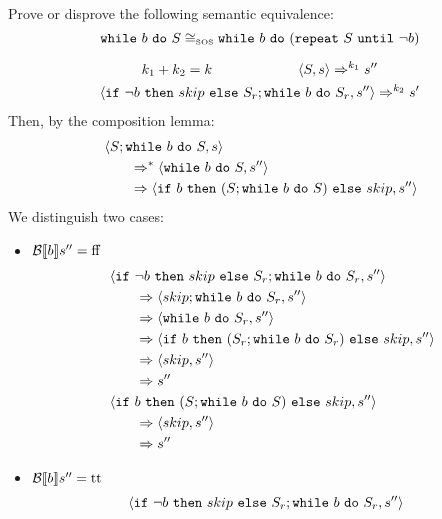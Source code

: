 \begin{exercise}{
    Prove or disprove the following semantic equivalence:
    \[ \texttt{while}\ b\ \texttt{do}\ S \cong_{\text{\tiny SOS}} \texttt{while}\ b\ \texttt{do}\ (\texttt{repeat}\ S\ \texttt{until}\ \neg b)  \]\vspace*{-0.6cm}
}
\begin{itemize}
\begin{itemize}
\begin{itemize}
\begin{gather*}
                            k_1 + k_2 = k \qquad\qquad\qquad \left<S, s\right> \Rightarrow^{k_1} s'' \\
                            \left<\texttt{if}\ \neg b\ \texttt{then}\ skip\ \texttt{else}\ S_r; \texttt{while}\ b\ \texttt{do}\ S_r, s''\right> \Rightarrow^{k_2} s'
                        \end{gather*}
                        Then, by the composition lemma:
                        \begin{align*}
                            &\left<S; \texttt{while}\ b\ \texttt{do}\ S, s\right>
                            \\&\qquad\Rightarrow^* \left<\texttt{while}\ b\ \texttt{do}\ S, s''\right>
                            \\&\qquad\Rightarrow \left<\texttt{if}\ b\ \texttt{then}\ (S; \texttt{while}\ b\ \texttt{do}\ S)\ \texttt{else}\ skip, s''\right>
                        \end{align*}
                        We distinguish two cases:
                        \begin{itemize}
                            \item $\mathcal{B} \llbracket b \rrbracket s'' = \text{ff}$
                                \begin{align*}
                                    &\left<\texttt{if}\ \neg b\ \texttt{then}\ skip\ \texttt{else}\ S_r; \texttt{while}\ b\ \texttt{do}\ S_r, s''\right>
                                    \\&\qquad\Rightarrow \left<skip; \texttt{while}\ b\ \texttt{do}\ S_r, s''\right>
                                    \\&\qquad\Rightarrow \left<\texttt{while}\ b\ \texttt{do}\ S_r, s''\right>
                                    \\&\qquad\Rightarrow \left<\texttt{if}\ b\ \texttt{then}\ (S_r; \texttt{while}\ b\ \texttt{do}\ S_r)\ \texttt{else}\ skip, s''\right>
                                    \\&\qquad\Rightarrow \left<skip, s''\right>
                                    \\&\qquad\Rightarrow s''
                                    \\
                                    &\left<\texttt{if}\ b\ \texttt{then}\ (S; \texttt{while}\ b\ \texttt{do}\ S)\ \texttt{else}\ skip, s''\right>
                                    \\&\qquad\Rightarrow \left<skip, s''\right>
                                    \\&\qquad\Rightarrow s''
                                \end{align*}
                            \item $\mathcal{B} \llbracket b \rrbracket s'' = \text{tt}$
                                \begin{align*}
                                    &\instr{\wif{\neg b}{skip}{S_r}; \wwhile{b}{S_r}}{s''}

\end{align*}
\end{itemize}
\end{itemize}
\end{itemize}
\end{itemize}
\end{exercise}
